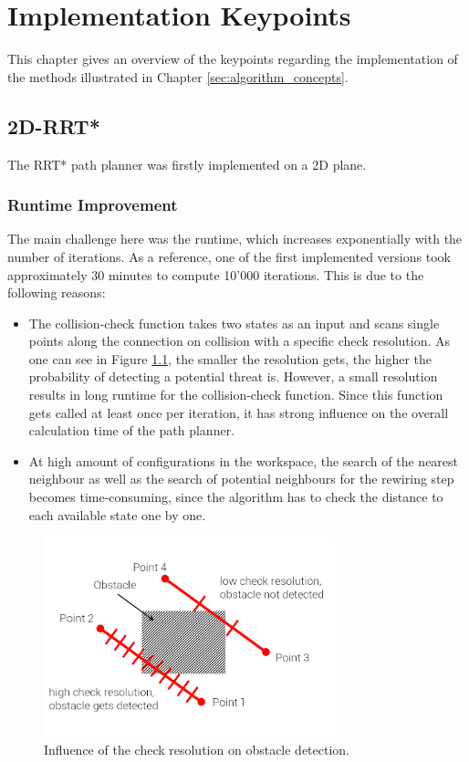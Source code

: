 \chapter{Implementation Keypoints }
\label{sec:implementation_keypoints}

This chapter gives an overview of the keypoints regarding the implementation of the methods illustrated in Chapter \ref{sec:algorithm_concepts}.

\section{2D-RRT*}

The RRT* path planner was firstly implemented on a 2D plane. 

\subsection{Runtime Improvement}

The main challenge here was the runtime, which increases exponentially with the number of iterations. As a reference, one of the first implemented versions took approximately 30 minutes to compute 10'000 iterations. This is due to the following reasons:

\begin{itemize}
	\item
	The collision-check function takes two states as an input and scans single points along the connection on collision with a specific check resolution. As one can see in Figure \ref{pics:obstacle_detection}, the smaller the resolution gets, the higher the probability of detecting a potential threat is. However, a small resolution results in long runtime for the collision-check function. Since this function gets called at least once per iteration, it has strong influence on the overall calculation time of the path planner. 
	\item
	At high amount of configurations in the workspace, the search of the nearest neighbour as well as the search of potential neighbours for the rewiring step becomes time-consuming, since the algorithm has to check the distance to each available state one by one.  	
\end{itemize} 

\begin{figure} [h]
	\centering
	\includegraphics[width=0.75\textwidth]{images/obstacle_detection.png}
	\caption{Influence of the check resolution on obstacle detection.}
	\label{pics:obstacle_detection}
\end{figure}

